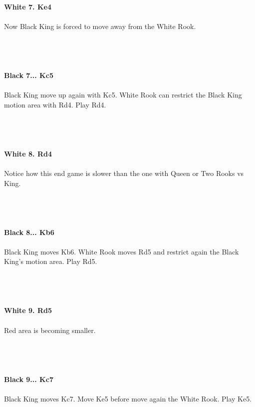 \documentclass{article}
\begin{document}
\textbf{White 7. Ke4}\\
\\
Now Black King is forced to move away from the White Rook.\\\\
\\

\\
\\
\textbf{Black 7... Kc5}\\
\\
Black King move up again with Kc5. White Rook can restrict the Black King motion area with Rd4. Play Rd4.\\\\
\\

\\
\\
\textbf{White 8. Rd4}\\
\\
Notice how this end game is slower than the one with Queen or Two Rooks vs King.\\\\
\\

\\
\\
\textbf{Black 8... Kb6}\\
\\
Black King moves Kb6. White Rook moves Rd5 and restrict again the Black King's motion area. Play Rd5.\\\\
\\

\\
\\
\textbf{White 9. Rd5}\\
\\
Red area is becoming smaller.\\\\
\\

\\
\\
\textbf{Black 9... Kc7}\\
\\
Black King moves Kc7. Move Ke5 before move again the White Rook. Play Ke5.\\\\
\end{document}
